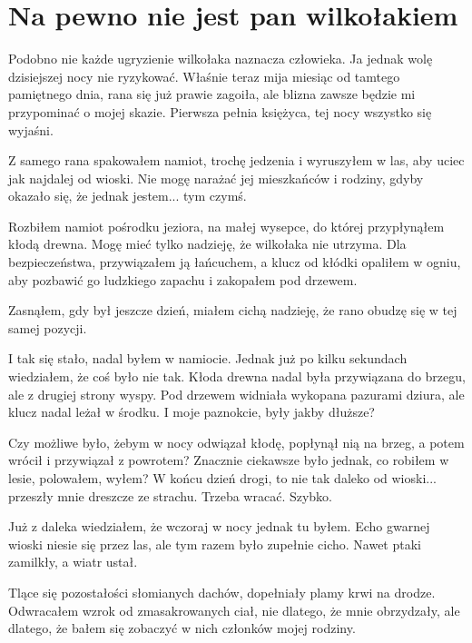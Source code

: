 \chapter{Na pewno nie jest pan wilkołakiem} 


Podobno nie każde ugryzienie wilkołaka naznacza człowieka.
Ja jednak wolę dzisiejszej nocy nie ryzykować.
Właśnie teraz mija miesiąc od tamtego pamiętnego dnia, rana się już prawie zagoiła, ale blizna zawsze będzie mi przypominać o mojej skazie.
Pierwsza pełnia księżyca, tej nocy wszystko się wyjaśni.

Z samego rana spakowałem namiot, trochę jedzenia i wyruszyłem w las, aby uciec jak najdalej od wioski.
Nie mogę narażać jej mieszkańców i rodziny, gdyby okazało się, że jednak jestem... tym czymś.

Rozbiłem namiot pośrodku jeziora, na małej wysepce, do której przypłynąłem kłodą drewna. 
Mogę mieć tylko nadzieję, że wilkołaka nie utrzyma.
Dla bezpieczeństwa, przywiązałem ją łańcuchem, a klucz od kłódki opaliłem w ogniu, aby pozbawić go ludzkiego zapachu i zakopałem pod drzewem.

Zasnąłem, gdy był jeszcze dzień, miałem cichą nadzieję, że rano obudzę się w tej samej pozycji.

\divider{}
I tak się stało, nadal byłem w namiocie. Jednak już po kilku sekundach wiedziałem, że coś było nie tak.
Kłoda drewna nadal była przywiązana do brzegu, ale z drugiej strony wyspy.
Pod drzewem widniała wykopana pazurami dziura, ale klucz nadal leżał w środku.
I moje paznokcie, były jakby dłuższe?

Czy możliwe było, żebym w nocy odwiązał kłodę, popłynął nią na brzeg, a potem wrócił i przywiązał z powrotem?
Znacznie ciekawsze było jednak, co robiłem w lesie, polowałem, wyłem? 
W końcu dzień drogi, to nie tak daleko od wioski... przeszły mnie dreszcze ze strachu.
Trzeba wracać. Szybko.

\divider{}
Już z daleka wiedziałem, że wczoraj w nocy jednak tu byłem.
Echo gwarnej wioski niesie się przez las, ale tym razem było zupełnie cicho.
Nawet ptaki zamilkły, a wiatr ustał.

Tlące się pozostałości słomianych dachów, dopełniały plamy krwi na drodze.
Odwracałem wzrok od zmasakrowanych ciał, nie dlatego, że mnie obrzydzały, ale dlatego, że bałem się zobaczyć w nich członków mojej rodziny.

